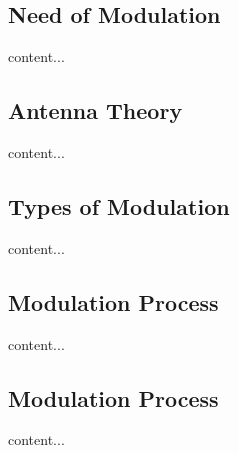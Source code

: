 \documentclass[12pt,a4paper]{article}%
\begin{document}
	\begin{flushleft}
		\subsection{Need of Modulation}
		\begin{flushleft}
			content...
		\end{flushleft}
		\subsection{Antenna Theory}
		\begin{flushleft}
			content...
		\end{flushleft}
		\subsection{Types of Modulation}
		\begin{flushleft}
			content...
		\end{flushleft}
		\subsection{Modulation Process}
		\begin{flushleft}
			content...
		\end{flushleft}
		\subsection{Modulation Process}
		\begin{flushleft}
			content...
		\end{flushleft}
	\end{flushleft}
	\pagebreak
\end{document}
